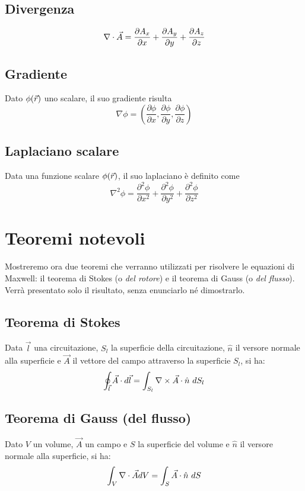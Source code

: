 \subsection{Divergenza}
\begin{equation}
  \nabla\cdot \vec{A} = \frac{\partial A_x}{\partial x} + \frac{\partial A_y}{\partial y} + \frac{\partial A_z}{\partial z}
\end{equation}
\subsection{Gradiente}
Dato $\phi(\vec{r})$ uno scalare, il suo gradiente risulta
\begin{equation}
  \nabla \phi = \left(\frac{\partial \phi}{\partial x} , \frac{\partial \phi}{\partial y}, \frac{\partial \phi}{\partial z}\right)
\end{equation}
\subsection{Laplaciano scalare}
Data una funzione scalare $\phi(\vec{r})$, il suo laplaciano è definito come
\begin{equation}
  \nabla^2 \phi = \frac{\partial^2 \phi}{\partial x^2} + \frac{\partial^2 \phi}{\partial y^2} + \frac{\partial^2 \phi}{\partial z^2}
\end{equation}

\section{Teoremi notevoli}
Mostreremo ora due teoremi che verranno utilizzati per risolvere le equazioni di Maxwell: il teorema di Stokes (o \emph{del rotore}) e il teorema di Gauss (o \emph{del flusso}).
Verrà presentato solo il risultato, senza enunciarlo né dimostrarlo.
\subsection{Teorema di Stokes}
Data $\vec{l}$ una circuitazione, $S_l$ la superficie della circuitazione, $\hat{n}$ il versore normale alla superficie  e $\vec{A}$ il vettore del campo attraverso la superficie $S_l$, si ha:
\begin{equation}
  \oint_{\vec{l}} \vec{A} \cdot d\vec{l} = \int_{S_l}\nabla\times \vec{A} \cdot \hat{n}~ d S_l
\end{equation}

\subsection{Teorema di Gauss (del flusso)}
Dato $V$ un volume, $\vec{A}$ un campo e $S$ la superficie del volume e $\hat{n}$
il versore normale alla superficie, si ha:
\begin{equation}
  \int_V \nabla\cdot \vec{A} dV = \int_S \vec{A}\cdot \hat{n} ~ dS
\end{equation}

